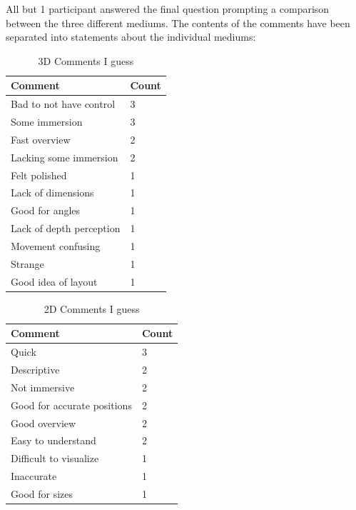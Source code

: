 All but 1 participant answered the final question prompting a comparison between the three different mediums. 
The contents of the comments have been separated into statements about the individual mediums:
\begin{multicols}{2}
	\begin{table}[H]
		\centering
		\caption{3D Comments I guess}
		\label{my-label}
		\begin{tabular}{p{5cm}|p{1cm}}
			Comment & Count \\ \hline
			Bad to not have control & 3 \\
			Some immersion & 3 \\
			Fast overview &2 \\
			Lacking some immersion &2 \\
			Felt polished& 1 \\
			Lack of dimensions& 1 \\
			Good for angles& 1 \\
			Lack of depth perception& 1 \\
			Movement confusing& 1 \\
			Strange& 1 \\
			Good idea of layout& 1 \\
		\end{tabular}
	\end{table}
	
	
\columnbreak

\begin{table}[H]
	\centering
	\caption{2D Comments I guess}
	\label{my-label}
	\begin{tabular}{p{5cm}|p{1cm}}
		Comment & Count \\ \hline
		Quick & 3 \\
		Descriptive & 2\\
		Not immersive & 2 \\
		Good for accurate positions & 2 \\
		Good overview  & 2 \\
		Easy to understand & 2 \\
		Difficult to visualize & 1 \\
		Inaccurate& 1 \\
		Good for sizes & 1 \\
	\end{tabular}
\end{table}
\end{multicols}



